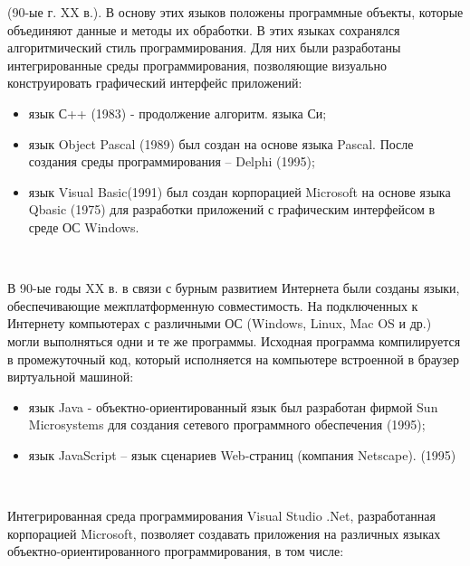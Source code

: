 
(90-ые г. XX в.). В основу этих языков положены программные объекты, которые объединяют данные и методы их обработки. В этих языках сохранялся алгоритмический стиль программирования. Для них были разработаны интегрированные среды программирования, позволяющие визуально конструировать графический интерфейс приложений: \\

\begin{itemize}
  \item язык С++ (1983) - продолжение алгоритм. языка Си;
  \item язык Object Pascal (1989) был создан на основе языка Pascal. После создания среды программирования – Delphi (1995);
  \item язык Visual Basic(1991) был создан корпорацией Microsoft на основе языка Qbasic (1975) для разработки приложений с графическим интерфейсом в среде ОС Windows.
\end{itemize}
\


В 90-ые годы XX в. в связи с бурным развитием Интернета были созданы языки, обеспечивающие межплатформенную совместимость. На подключенных к Интернету компьютерах с различными ОС (Windows, Linux, Mac OS и др.) могли выполняться одни и те же программы. Исходная программа компилируется в промежуточный код, который исполняется на компьютере встроенной в браузер виртуальной машиной: \\

\begin{itemize}
  \item язык Java - объектно-ориентированный язык был разработан фирмой Sun Microsystems для создания сетевого программного обеспечения (1995);
  \item язык JavaScript – язык сценариев Web-страниц (компания Netscape). (1995)
\end{itemize}
\


Интегрированная среда программирования Visual Studio .Net, разработанная корпорацией Microsoft, позволяет создавать приложения на различных языках объектно-ориентированного программирования, в том числе: \\

